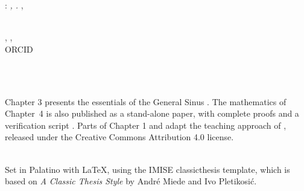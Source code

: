 \thispagestyle{empty}

\hfill

\vfill

\noindent\myName: \textit{\myTitle, \myVolume. \mySubtitle}, \textcopyright\ \myTime

\bigskip

\noindent{}\\
\myName, \myAffiliation, \myLocation\\
ORCID \myORCID\\
\href{mailto:m.derraz@proton.me}{\myEmail}

\bigskip

\noindent{}\\

\bigskip

\noindent{}\\
Chapter 3 presents the essentials of the General Sinus \citep{Derraz2026GSP}.
The mathematics of Chapter~4 is also published as a stand-alone paper, with complete proofs and a verification script \citep{DerrazGNPreprint2026}.
Parts of Chapter 1 and  adapt the teaching approach of \citet{MokhithiShock2020}, released under the Creative Commons Attribution 4.0 license.

\bigskip

\noindent{}\\
Set in Palatino with \LaTeX, using the IMISE classicthesis template, which is based on \emph{A Classic Thesis Style} by Andr\'e Miede and Ivo Pletikosi\'c.

\bigskip

\noindent{}\\
\myVersion
